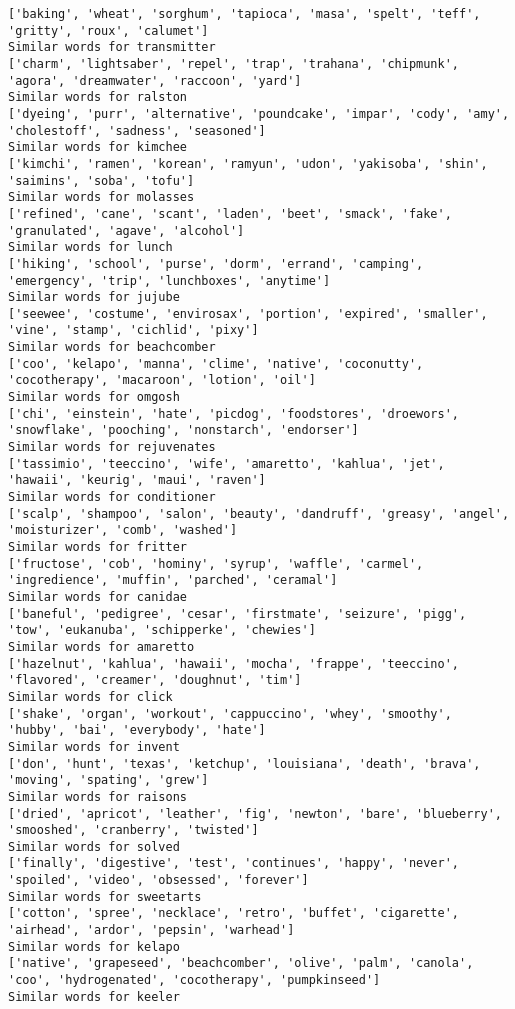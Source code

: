 \documentclass[11pt]{article}
\begin{document}
\begin{Verbatim}[commandchars=\\\{\}]
['baking', 'wheat', 'sorghum', 'tapioca', 'masa', 'spelt', 'teff', 'gritty', 'roux', 'calumet']
Similar words for transmitter
['charm', 'lightsaber', 'repel', 'trap', 'trahana', 'chipmunk', 'agora', 'dreamwater', 'raccoon', 'yard']
Similar words for ralston
['dyeing', 'purr', 'alternative', 'poundcake', 'impar', 'cody', 'amy', 'cholestoff', 'sadness', 'seasoned']
Similar words for kimchee
['kimchi', 'ramen', 'korean', 'ramyun', 'udon', 'yakisoba', 'shin', 'saimins', 'soba', 'tofu']
Similar words for molasses
['refined', 'cane', 'scant', 'laden', 'beet', 'smack', 'fake', 'granulated', 'agave', 'alcohol']
Similar words for lunch
['hiking', 'school', 'purse', 'dorm', 'errand', 'camping', 'emergency', 'trip', 'lunchboxes', 'anytime']
Similar words for jujube
['seewee', 'costume', 'envirosax', 'portion', 'expired', 'smaller', 'vine', 'stamp', 'cichlid', 'pixy']
Similar words for beachcomber
['coo', 'kelapo', 'manna', 'clime', 'native', 'coconutty', 'cocotherapy', 'macaroon', 'lotion', 'oil']
Similar words for omgosh
['chi', 'einstein', 'hate', 'picdog', 'foodstores', 'droewors', 'snowflake', 'pooching', 'nonstarch', 'endorser']
Similar words for rejuvenates
['tassimio', 'teeccino', 'wife', 'amaretto', 'kahlua', 'jet', 'hawaii', 'keurig', 'maui', 'raven']
Similar words for conditioner
['scalp', 'shampoo', 'salon', 'beauty', 'dandruff', 'greasy', 'angel', 'moisturizer', 'comb', 'washed']
Similar words for fritter
['fructose', 'cob', 'hominy', 'syrup', 'waffle', 'carmel', 'ingredience', 'muffin', 'parched', 'ceramal']
Similar words for canidae
['baneful', 'pedigree', 'cesar', 'firstmate', 'seizure', 'pigg', 'tow', 'eukanuba', 'schipperke', 'chewies']
Similar words for amaretto
['hazelnut', 'kahlua', 'hawaii', 'mocha', 'frappe', 'teeccino', 'flavored', 'creamer', 'doughnut', 'tim']
Similar words for click
['shake', 'organ', 'workout', 'cappuccino', 'whey', 'smoothy', 'hubby', 'bai', 'everybody', 'hate']
Similar words for invent
['don', 'hunt', 'texas', 'ketchup', 'louisiana', 'death', 'brava', 'moving', 'spating', 'grew']
Similar words for raisons
['dried', 'apricot', 'leather', 'fig', 'newton', 'bare', 'blueberry', 'smooshed', 'cranberry', 'twisted']
Similar words for solved
['finally', 'digestive', 'test', 'continues', 'happy', 'never', 'spoiled', 'video', 'obsessed', 'forever']
Similar words for sweetarts
['cotton', 'spree', 'necklace', 'retro', 'buffet', 'cigarette', 'airhead', 'ardor', 'pepsin', 'warhead']
Similar words for kelapo
['native', 'grapeseed', 'beachcomber', 'olive', 'palm', 'canola', 'coo', 'hydrogenated', 'cocotherapy', 'pumpkinseed']
Similar words for keeler

\end{Verbatim}
\end{document}
